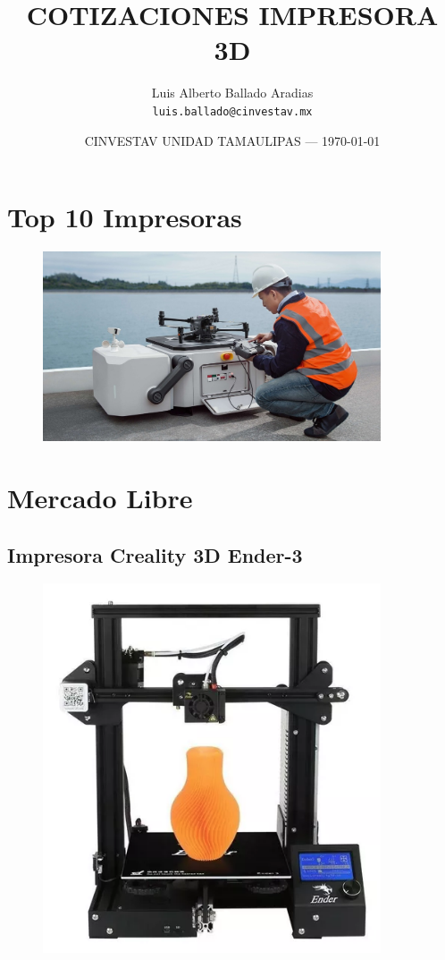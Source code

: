 \documentclass{article}
\title{COTIZACIONES IMPRESORA 3D} %
\author{Luis Alberto Ballado Aradias\\ \texttt{luis.ballado@cinvestav.mx}} %
\date{CINVESTAV UNIDAD TAMAULIPAS --- \today} %
\begin{document}
\maketitle %


\section{Top 10 Impresoras} %

\begin{figure}[h]
\includegraphics[width=10cm]{pictures/drone_box.jpg}
\centering
\end{figure}

\section{Mercado Libre} %

\subsection{Impresora Creality 3D Ender-3}

\begin{figure}[h]
\includegraphics[width=10cm]{pictures/creality_3d.png}
\centering
\end{figure}
\end{document}
